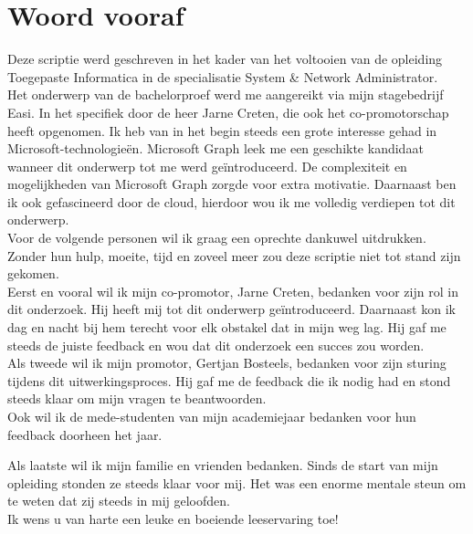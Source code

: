 
\chapter*{Woord vooraf}%
\label{ch:voorwoord}


Deze scriptie werd geschreven in het kader van het voltooien van de opleiding Toegepaste Informatica in de specialisatie System \& Network Administrator. \\

Het onderwerp van de bachelorproef werd me aangereikt via mijn stagebedrijf Easi. In het specifiek door de heer Jarne Creten, die ook het co-promotorschap heeft opgenomen. Ik heb van in het begin steeds een grote interesse gehad in Microsoft-technologieën. Microsoft Graph leek me een geschikte kandidaat wanneer dit onderwerp tot me werd geïntroduceerd. De complexiteit en mogelijkheden van Microsoft Graph zorgde voor extra motivatie. Daarnaast ben ik ook gefascineerd door de cloud, hierdoor wou ik me volledig verdiepen tot dit onderwerp. \\

Voor de volgende personen wil ik graag een oprechte dankuwel uitdrukken. Zonder hun hulp, moeite, tijd en zoveel meer zou deze scriptie niet tot stand zijn gekomen. \\

Eerst en vooral wil ik mijn co-promotor, Jarne Creten, bedanken voor zijn rol in dit onderzoek. Hij heeft mij tot dit onderwerp geïntroduceerd. Daarnaast kon ik dag en nacht bij hem terecht voor elk obstakel dat in mijn weg lag. Hij gaf me steeds de juiste feedback en wou dat dit onderzoek een succes zou worden. \\

Als tweede wil ik mijn promotor, Gertjan Bosteels, bedanken voor zijn sturing tijdens dit uitwerkingsproces. Hij gaf me de feedback die ik nodig had en stond steeds klaar om mijn vragen te beantwoorden. \\

Ook wil ik de mede-studenten van mijn academiejaar bedanken voor hun feedback doorheen het jaar.

Als laatste wil ik mijn familie en vrienden bedanken. Sinds de start van mijn opleiding stonden ze steeds klaar voor mij. Het was een enorme mentale steun om te weten dat zij steeds in mij geloofden. \\

Ik wens u van harte een leuke en boeiende leeservaring toe!

